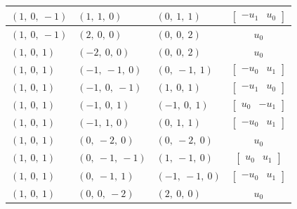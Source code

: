 \documentclass[11pt]{article}
\theoremstyle{definition}
\begin{document}
\begin{longtable}{|l|l|l|c|}
    \hline
    $\left( 1, \  0, \  -1\right)$ & $\left( 1, \  1, \  0\right)$ & $\left( 0, \  1, \  1\right)$ & $\left[\begin{matrix}- u_{1} & u_{0}\end{matrix}\right]$ \\
    \hline
    $\left( 1, \  0, \  -1\right)$ & $\left( 2, \  0, \  0\right)$ & $\left( 0, \  0, \  2\right)$ & $u_{0}$ \\
    \hline
    $\left( 1, \  0, \  1\right)$ & $\left( -2, \  0, \  0\right)$ & $\left( 0, \  0, \  2\right)$ & $u_{0}$ \\
    \hline
    $\left( 1, \  0, \  1\right)$ & $\left( -1, \  -1, \  0\right)$ & $\left( 0, \  -1, \  1\right)$ & $\left[\begin{matrix}- u_{0} & u_{1}\end{matrix}\right]$ \\
    \hline
    $\left( 1, \  0, \  1\right)$ & $\left( -1, \  0, \  -1\right)$ & $\left( 1, \  0, \  1\right)$ & $\left[\begin{matrix}- u_{1} & u_{0}\end{matrix}\right]$ \\
    \hline
    $\left( 1, \  0, \  1\right)$ & $\left( -1, \  0, \  1\right)$ & $\left( -1, \  0, \  1\right)$ & $\left[\begin{matrix}u_{0} & - u_{1}\end{matrix}\right]$ \\
    \hline
    $\left( 1, \  0, \  1\right)$ & $\left( -1, \  1, \  0\right)$ & $\left( 0, \  1, \  1\right)$ & $\left[\begin{matrix}- u_{0} & u_{1}\end{matrix}\right]$ \\
    \hline
    $\left( 1, \  0, \  1\right)$ & $\left( 0, \  -2, \  0\right)$ & $\left( 0, \  -2, \  0\right)$ & $u_{0}$ \\
    \hline
    $\left( 1, \  0, \  1\right)$ & $\left( 0, \  -1, \  -1\right)$ & $\left( 1, \  -1, \  0\right)$ & $\left[\begin{matrix}u_{0} & u_{1}\end{matrix}\right]$ \\
    \hline
    $\left( 1, \  0, \  1\right)$ & $\left( 0, \  -1, \  1\right)$ & $\left( -1, \  -1, \  0\right)$ & $\left[\begin{matrix}- u_{0} & u_{1}\end{matrix}\right]$ \\
    \hline
    $\left( 1, \  0, \  1\right)$ & $\left( 0, \  0, \  -2\right)$ & $\left( 2, \  0, \  0\right)$ & $u_{0}$ \\

\end{longtable}
\end{document}
